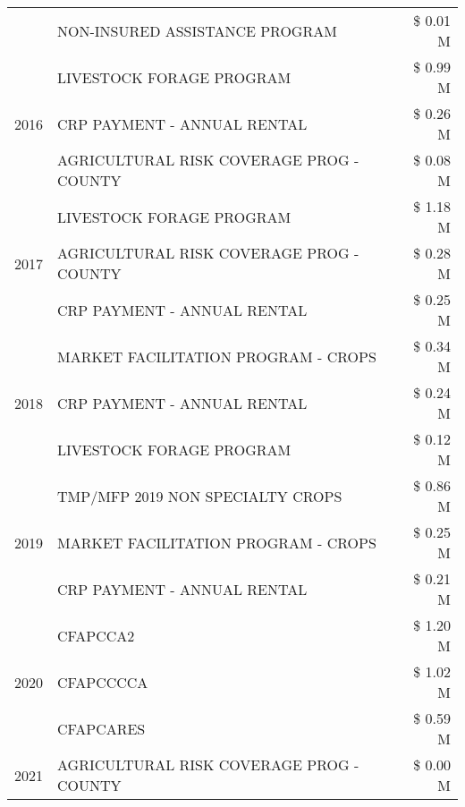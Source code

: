 \begin{tabular}{llr}
 & NON-INSURED ASSISTANCE PROGRAM & \$ 0.01 M \\
\cline{1-3}
\multirow[t]{3}{*}{2016} & LIVESTOCK FORAGE PROGRAM                      & \$ 0.99 M \\
 & CRP PAYMENT - ANNUAL RENTAL                   & \$ 0.26 M \\
 & AGRICULTURAL RISK COVERAGE PROG - COUNTY      & \$ 0.08 M \\
\cline{1-3}
\multirow[t]{3}{*}{2017} & LIVESTOCK FORAGE PROGRAM & \$ 1.18 M \\
 & AGRICULTURAL RISK COVERAGE PROG - COUNTY & \$ 0.28 M \\
 & CRP PAYMENT - ANNUAL RENTAL & \$ 0.25 M \\
\cline{1-3}
\multirow[t]{3}{*}{2018} & MARKET FACILITATION PROGRAM - CROPS & \$ 0.34 M \\
 & CRP PAYMENT - ANNUAL RENTAL & \$ 0.24 M \\
 & LIVESTOCK FORAGE PROGRAM & \$ 0.12 M \\
\cline{1-3}
\multirow[t]{3}{*}{2019} & TMP/MFP 2019 NON SPECIALTY CROPS & \$ 0.86 M \\
 & MARKET FACILITATION PROGRAM - CROPS & \$ 0.25 M \\
 & CRP PAYMENT - ANNUAL RENTAL & \$ 0.21 M \\
\cline{1-3}
\multirow[t]{3}{*}{2020} & CFAPCCA2 & \$ 1.20 M \\
 & CFAPCCCCA & \$ 1.02 M \\
 & CFAPCARES & \$ 0.59 M \\
\cline{1-3}
2021 & AGRICULTURAL RISK COVERAGE PROG - COUNTY & \$ 0.00 M \\
\cline{1-3}
\bottomrule
\end{tabular}
